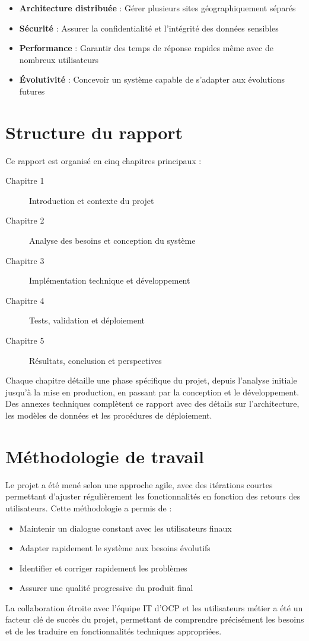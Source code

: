 \begin{itemize}
    \item \textbf{Architecture distribuée} : Gérer plusieurs sites géographiquement séparés
    \item \textbf{Sécurité} : Assurer la confidentialité et l'intégrité des données sensibles
    \item \textbf{Performance} : Garantir des temps de réponse rapides même avec de nombreux utilisateurs
    \item \textbf{Évolutivité} : Concevoir un système capable de s'adapter aux évolutions futures
\end{itemize}

\section{Structure du rapport}
Ce rapport est organisé en cinq chapitres principaux :

\begin{description}
    \item[Chapitre 1] Introduction et contexte du projet
    \item[Chapitre 2] Analyse des besoins et conception du système
    \item[Chapitre 3] Implémentation technique et développement
    \item[Chapitre 4] Tests, validation et déploiement
    \item[Chapitre 5] Résultats, conclusion et perspectives
\end{description}

Chaque chapitre détaille une phase spécifique du projet, depuis l'analyse initiale jusqu'à la mise en production, en passant par la conception et le développement. Des annexes techniques complètent ce rapport avec des détails sur l'architecture, les modèles de données et les procédures de déploiement.

\section{Méthodologie de travail}
Le projet a été mené selon une approche agile, avec des itérations courtes permettant d'ajuster régulièrement les fonctionnalités en fonction des retours des utilisateurs. Cette méthodologie a permis de :

\begin{itemize}
    \item Maintenir un dialogue constant avec les utilisateurs finaux
    \item Adapter rapidement le système aux besoins évolutifs
    \item Identifier et corriger rapidement les problèmes
    \item Assurer une qualité progressive du produit final
\end{itemize}

La collaboration étroite avec l'équipe IT d'OCP et les utilisateurs métier a été un facteur clé de succès du projet, permettant de comprendre précisément les besoins et de les traduire en fonctionnalités techniques appropriées.
